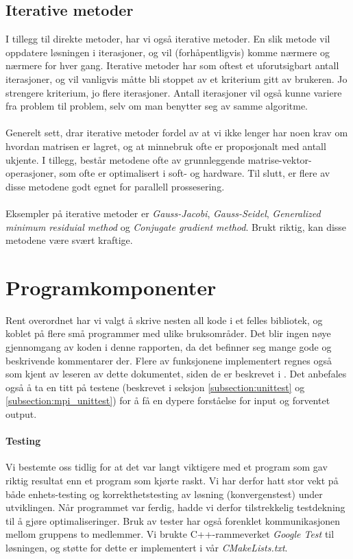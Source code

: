 \documentclass{article}
\begin{document}
\subsection{Iterative metoder}
I tillegg til direkte metoder, har vi også iterative metoder. En slik metode vil oppdatere løsningen i iterasjoner, og vil (forhåpentligvis) komme nærmere og nærmere for hver gang. Iterative metoder har som oftest et uforutsigbart antall iterasjoner, og vil vanligvis måtte bli stoppet av et kriterium gitt av brukeren. Jo strengere kriterium, jo flere iterasjoner. Antall iterasjoner vil også kunne variere fra problem til problem, selv om man benytter seg av samme algoritme.\\
\\
Generelt sett, drar iterative metoder fordel av at vi ikke lenger har noen krav om hvordan matrisen er lagret, og at minnebruk ofte er proposjonalt med antall ukjente. I tillegg, består metodene ofte av grunnleggende matrise-vektor-operasjoner, som ofte er optimalisert i soft- og hardware. Til slutt, er flere av disse metodene godt egnet for parallell prossesering. \\
\\
Eksempler på iterative metoder er \emph{Gauss-Jacobi}, \emph{Gauss-Seidel}, \emph{Generalized minimum residuial method} og \emph{Conjugate gradient method}. Brukt riktig, kan disse metodene være svært kraftige.

\section{Programkomponenter}
\label{section:programkomponenter}
Rent overordnet har vi valgt å skrive nesten all kode i et felles bibliotek, og koblet på flere små programmer med ulike bruksområder. Det blir ingen nøye gjennomgang av koden i denne rapporten, da det befinner seg mange gode og beskrivende kommentarer der. Flere av funksjonene implementert regnes også som kjent av leseren av dette dokumentet, siden de er beskrevet i \cite{fast-poisson}. Det anbefales også å ta en titt på testene (beskrevet i seksjon \ref{subsection:unittest} og \ref{subsection:mpi_unittest}) for å få en dypere forståelse for input og forventet output.

\paragraph{Testing}
Vi bestemte oss tidlig for at det var langt viktigere med et program som gav riktig resultat enn et program som kjørte raskt. Vi har derfor hatt stor vekt på både enhets-testing og korrekthetstesting av løsning (konvergenstest) under utviklingen. Når programmet var ferdig, hadde vi derfor tilstrekkelig testdekning til å gjøre optimaliseringer. Bruk av tester har også forenklet kommunikasjonen mellom gruppens to medlemmer. Vi brukte C++-rammeverket \emph{Google Test} til løsningen, og støtte for dette er implementert i vår \emph{CMakeLists.txt}.
\end{document}
